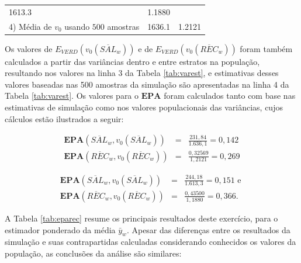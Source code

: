 \documentclass[]{book}
\theoremstyle{definition}
\theoremstyle{definition}
\theoremstyle{definition}
\theoremstyle{remark}
\begin{document}
\begin{longtable}[]{@{}lcc@{}}
\begin{minipage}[t]{0.14\columnwidth}
1613.3\strut
\end{minipage} & \begin{minipage}[t]{0.14\columnwidth}\centering\strut
1.1880\strut
\end{minipage}\tabularnewline
\begin{minipage}[t]{0.62\columnwidth}\raggedright\strut
4) Média de \(v_{0}\) usando \(500\) amostras\strut
\end{minipage} & \begin{minipage}[t]{0.14\columnwidth}\centering\strut
1636.1\strut
\end{minipage} & \begin{minipage}[t]{0.14\columnwidth}\centering\strut
1.2121\strut
\end{minipage}\tabularnewline
\bottomrule
\end{longtable}

Os valores de
\(E_{VERD}\left( v_{0}\left( \overline{SAL}_{w}\right) \right)\) e de
\(E_{VERD}\left( v_{0}\left( \overline{REC}_{w}\right) \right)\) foram
também calculados a partir das variâncias dentro e entre estratos na
população, resultando nos valores na linha 3 da Tabela \ref{tab:varest},
e estimativas desses valores baseadas nas 500 amostras da simulação são
apresentadas na linha 4 da Tabela \ref{tab:varest}. Os valores para o
\(\mathbf{EPA}\) foram calculados tanto com base nas estimativas de
simulação como nos valores populacionais das variâncias, cujos cálculos
estão ilustrados a seguir:

\begin{eqnarray*}
\mathbf{EPA}\left(\overline{SAL}_{w},v_{0}\left(\overline{SAL}_{w}\right)\right) &=&\frac{231,84}{1.636,1}=0,142 \\
\mathbf{EPA}\left( \overline{REC}_{w},v_{0}\left( \overline{REC}_{w}\right)
\right) &=&\frac{0,32569}{1,2121}=0,269
\end{eqnarray*}

\begin{eqnarray*}
\mathbf{EPA}\left( \overline{SAL}_{w},v_{0}\left( \overline{SAL}_{w}\right)
\right) &=&\frac{244,18}{1.613,3}=0,151\mbox{ e } \\
\mathbf{EPA}\left( \overline{REC}_{w},v_{0}\left( \overline{REC}_{w}\right)
\right) &=&\frac{0,43500}{1,1880}=0,366.
\end{eqnarray*}

A Tabela \ref{tab:eparec} resume os principais resultados deste
exercício, para o estimador ponderado da média \(\bar{y}_{w}\). Apesar
das diferenças entre os resultados da simulação e suas contrapartidas
calculadas considerando conhecidos os valores da população, as
conclusões da análise são similares:
\end{document}
